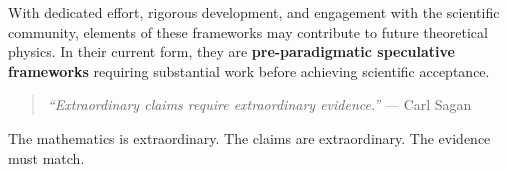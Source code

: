 With dedicated effort, rigorous development, and engagement with the scientific community, elements of these frameworks may contribute to future theoretical physics. In their current form, they are \textbf{pre-paradigmatic speculative frameworks} requiring substantial work before achieving scientific acceptance.

\begin{quote}
\textit{``Extraordinary claims require extraordinary evidence.''} --- Carl Sagan
\end{quote}

The mathematics is extraordinary. The claims are extraordinary. The evidence must match.
